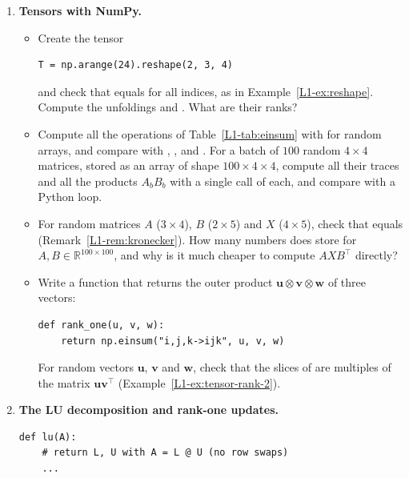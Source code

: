 \begin{enumerate}[label=\textbf{P\arabic*.}, leftmargin=*]
    \item \homework{} \textbf{Tensors with NumPy.}
    \begin{itemize}
        \item Create the tensor
\begin{lstlisting}
T = np.arange(24).reshape(2, 3, 4)
\end{lstlisting}
        and check that  equals  for all indices, as in Example~\ref{L1-ex:reshape}. Compute the unfoldings  and . What are their ranks?
        \item Compute all the operations of Table~\ref{L1-tab:einsum} with  for random arrays, and compare with , ,  and . For a batch of $100$ random $4 \times 4$ matrices, stored as an array of shape $100 \times 4 \times 4$, compute all their traces and all the products $A_bB_b$ with a single call of  each, and compare with a Python loop.
        \item For random matrices $A$ ($3 \times 4$), $B$ ($2 \times 5$) and $X$ ($4 \times 5$), check that  equals  (Remark~\ref{L1-rem:kronecker}). How many numbers does  store for $A, B \in \mathbb{R}^{100 \times 100}$, and why is it much cheaper to compute $AXB^\top$ directly?
        \item Write a function that returns the outer product $\mathbf{u} \otimes \mathbf{v} \otimes \mathbf{w}$ of three vectors:
\begin{lstlisting}
def rank_one(u, v, w):
    return np.einsum("i,j,k->ijk", u, v, w)
\end{lstlisting}
        For random vectors $\mathbf{u}$, $\mathbf{v}$ and $\mathbf{w}$, check that the slices  of  are multiples of the matrix $\mathbf{u}\mathbf{v}^\top$ (Example~\ref{L1-ex:tensor-rank-2}).
    \end{itemize}

    \item \homework{} \textbf{The LU decomposition and rank-one updates.}
\begin{lstlisting}
def lu(A):
    # return L, U with A = L @ U (no row swaps)
    ...


\end{lstlisting}
\end{enumerate}
